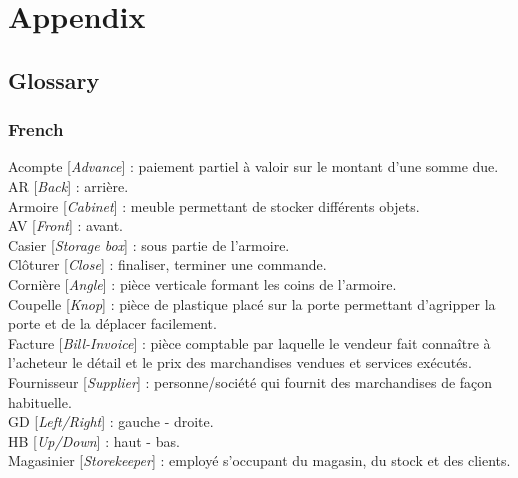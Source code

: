 
\chapter{Appendix} %

\label{AppendixA} %

\vspace{\baselineskip}
\vspace{\baselineskip}

\section{Glossary}
    \subsection{French}
        Acompte [\textit{Advance}] : paiement partiel à valoir sur le montant d'une somme due.\\
        AR [\textit{Back}] : arrière.\\
        Armoire [\textit{Cabinet}] : meuble permettant de stocker différents objets.\\
        AV [\textit{Front}] : avant.\\
        Casier [\textit{Storage box}] : sous partie de l’armoire. \\
        Clôturer [\textit{Close}] : finaliser, terminer une commande. \\
        Cornière [\textit{Angle}] : pièce verticale formant les coins de l’armoire. \\
        Coupelle [\textit{Knop}] : pièce de plastique placé sur la porte permettant d’agripper la porte et de la déplacer facilement. \\
        Facture [\textit{Bill-Invoice}] : pièce comptable par laquelle le vendeur fait connaître à l'acheteur le détail et le prix des marchandises vendues et services exécutés. \\
        Fournisseur [\textit{Supplier}] : personne/société qui fournit des marchandises de façon habituelle. \\
        GD [\textit{Left/Right}] : gauche - droite.\\
        HB [\textit{Up/Down}] : haut - bas.\\
        Magasinier [\textit{Storekeeper}] : employé s’occupant du magasin, du stock et des clients. \\

